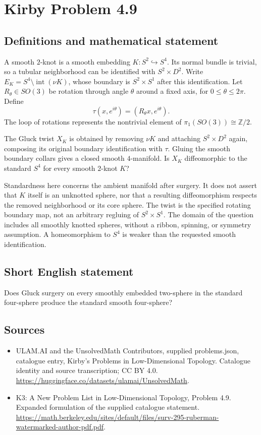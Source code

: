 \documentclass[11pt,a4paper]{article}
\begin{document}
\section*{Kirby Problem 4.9}\label{statement}

\subsection{Definitions and mathematical statement}
A smooth $2$-knot is a smooth embedding $K:S^2\hookrightarrow S^4$.
Its normal bundle is trivial, so a tubular neighborhood can be
identified with $S^2\times D^2$. Write
$E_K=S^4\setminus\operatorname{int}(\nu K)$, whose boundary is
$S^2\times S^1$ after this identification.
Let $R_\theta\in SO(3)$ be rotation through angle $\theta$ around
a fixed axis, for $0\le\theta\le2\pi$. Define
\[
 \tau(x,e^{i\theta})=(R_\theta x,e^{i\theta}).
\]
The loop of rotations represents the nontrivial element of
$\pi_1(SO(3))\cong\mathbb Z/2$.

The Gluck twist $X_K$ is obtained by removing $\nu K$ and attaching
$S^2\times D^2$ again, composing its original boundary identification
with $\tau$. Gluing the smooth boundary collars gives a closed smooth
$4$-manifold. Is $X_K$ diffeomorphic to the standard $S^4$ for every
smooth $2$-knot $K$?

Standardness here concerns the ambient manifold after surgery. It does
not assert that $K$ itself is an unknotted sphere, nor that a resulting
diffeomorphism respects the removed neighborhood or its core sphere.
The twist is the specified rotating boundary map, not an arbitrary
regluing of $S^2\times S^1$. The domain of the question includes all
smoothly knotted spheres, without a ribbon, spinning, or symmetry
assumption. A homeomorphism to $S^4$ is weaker than the requested
smooth identification.
\subsection{Short English statement}
Does Gluck surgery on every smoothly embedded two-sphere in the standard four-sphere produce the standard smooth four-sphere?
\subsection{Sources}
\begin{itemize}
\item[S1] ULAM.AI and the UnsolvedMath Contributors, supplied problems.json, catalogue entry, Kirby's Problems in Low-Dimensional Topology. Catalogue identity and source transcription; CC BY 4.0.
\url{https://huggingface.co/datasets/ulamai/UnsolvedMath}.
\item[S2] K3: A New Problem List in Low-Dimensional Topology, Problem 4.9. Expanded formulation of the supplied catalogue statement.
\url{https://math.berkeley.edu/sites/default/files/surv-295-ruberman-watermarked-author-pdf.pdf}.
\end{itemize}
\end{document}
